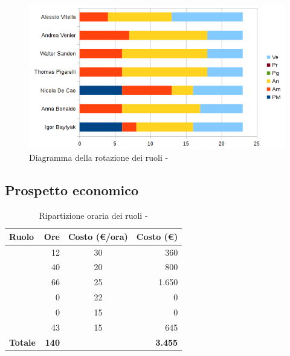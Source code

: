 \documentclass[12pt,a4paper]{article}
\begin{document}
\begin{center}
	\begin{figure}[H]
		\centering
		\includegraphics[width=\textwidth]{diagrammaBarreAnalisiRotazioneRuoli.png}
		\caption{Diagramma della rotazione dei ruoli - \FA}
	\end{figure}
\end{center}

\newpage
\subsection{Prospetto economico}

\begin{table}[H]
	\begin{center}
		\begin{tabular}{l r c r}
			\toprule
			\textbf{Ruolo}	& \textbf{Ore} & \textbf{Costo (\euro/ora)}	& \textbf{Costo (\euro)} \\
			\midrule
			\midrule
			\RE & 12 & 30 & 360\\
			\midrule
			\AM & 40 & 20 & 800\\ 
			\midrule
			\AN & 66 & 25 & 1.650\\ 
			\midrule
			\PG & 0 & 22 & 0\\ 
			\midrule
			\PR & 0 & 15 & 0\\ 
			\midrule
			\VR & 43 & 15 & 645\\ 
			\midrule
			\textbf{Totale} & \textbf{140} &  & \textbf{3.455}\\
			\bottomrule
		\end{tabular}
		\caption{Ripartizione oraria dei ruoli - \FA}
	\end{center}
\end{table}
\end{document}
